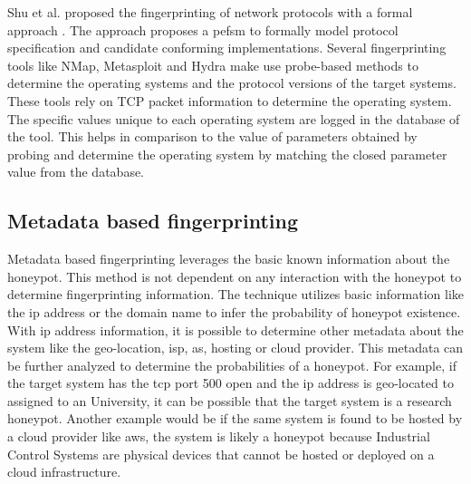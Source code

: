 Shu et al.  proposed the fingerprinting of network protocols with a formal approach \cite{shu2006network}. The approach proposes a \acrfull{pefsm} to formally model protocol specification and candidate conforming implementations. Several fingerprinting tools like NMap, Metasploit and Hydra make use probe-based methods to determine the operating systems and the protocol versions of the target systems. These tools rely on TCP packet information to determine the operating system. The specific values unique to each operating system are logged in the database of the tool. This helps in comparison to the value of parameters obtained by probing and determine the operating system by matching the closed parameter value from the database.

\subsection{Metadata based fingerprinting}
Metadata based fingerprinting leverages the basic known information about the honeypot. This method is  not dependent on any interaction with the honeypot to determine fingerprinting information. The technique utilizes basic information like the \acrshort{ip} address or the domain name to infer the probability of honeypot existence. With \acrshort{ip} address information, it is possible to determine other metadata about the system like the geo-location, \acrshort{isp}, \acrshort{as}, hosting or cloud provider. This metadata can be further analyzed to determine the probabilities of a honeypot. For example, if the target system has the \acrshort{tcp} port 500 open and the \acrshort{ip} address is geo-located to assigned to an University, it can be possible that the target system is a research honeypot. Another example would be if the same system is found to be hosted by a cloud provider like \acrshort{aws}, the system is likely a honeypot because Industrial Control Systems are physical devices that cannot be hosted or deployed on a cloud infrastructure.

